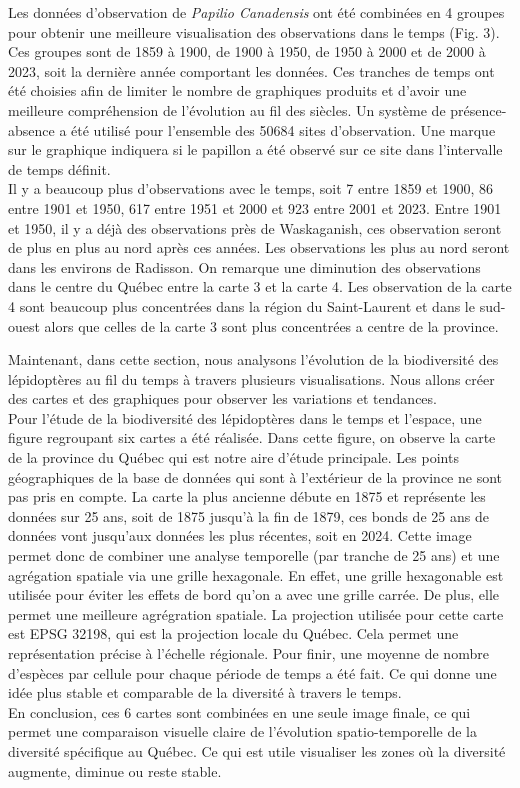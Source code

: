 \documentclass[9pt,twocolumn,twoside,]{pnas-new}
\begin{document}
Les données d'observation de \emph{Papilio Canadensis} ont été combinées
en 4 groupes pour obtenir une meilleure visualisation des observations
dans le temps (Fig. 3). Ces groupes sont de 1859 à 1900, de 1900 à 1950,
de 1950 à 2000 et de 2000 à 2023, soit la dernière année comportant les
données. Ces tranches de temps ont été choisies afin de limiter le
nombre de graphiques produits et d'avoir une meilleure compréhension de
l'évolution au fil des siècles. Un système de présence-absence a été
utilisé pour l'ensemble des 50684 sites d'observation. Une marque sur le
graphique indiquera si le papillon a été observé sur ce site dans
l'intervalle de temps définit.\\
Il y a beaucoup plus d'observations avec le temps, soit 7 entre 1859 et
1900, 86 entre 1901 et 1950, 617 entre 1951 et 2000 et 923 entre 2001 et
2023. Entre 1901 et 1950, il y a déjà des observations près de
Waskaganish, ces observation seront de plus en plus au nord après ces
années. Les observations les plus au nord seront dans les environs de
Radisson. On remarque une diminution des observations dans le centre du
Québec entre la carte 3 et la carte 4. Les observation de la carte 4
sont beaucoup plus concentrées dans la région du Saint-Laurent et dans
le sud-ouest alors que celles de la carte 3 sont plus concentrées a
centre de la province.

Maintenant, dans cette section, nous analysons l'évolution de la
biodiversité des lépidoptères au fil du temps à travers plusieurs
visualisations. Nous allons créer des cartes et des graphiques pour
observer les variations et tendances.\\
Pour l'étude de la biodiversité des lépidoptères dans le temps et
l'espace, une figure regroupant six cartes a été réalisée. Dans cette
figure, on observe la carte de la province du Québec qui est notre aire
d'étude principale. Les points géographiques de la base de données qui
sont à l'extérieur de la province ne sont pas pris en compte. La carte
la plus ancienne débute en 1875 et représente les données sur 25 ans,
soit de 1875 jusqu'à la fin de 1879, ces bonds de 25 ans de données vont
jusqu'aux données les plus récentes, soit en 2024. Cette image permet
donc de combiner une analyse temporelle (par tranche de 25 ans) et une
agrégation spatiale via une grille hexagonale. En effet, une grille
hexagonable est utilisée pour éviter les effets de bord qu'on a avec une
grille carrée. De plus, elle permet une meilleure agrégration spatiale.
La projection utilisée pour cette carte est EPSG 32198, qui est la
projection locale du Québec. Cela permet une représentation précise à
l'échelle régionale. Pour finir, une moyenne de nombre d'espèces par
cellule pour chaque période de temps a été fait. Ce qui donne une idée
plus stable et comparable de la diversité à travers le temps.\\
En conclusion, ces 6 cartes sont combinées en une seule image finale, ce
qui permet une comparaison visuelle claire de l'évolution
spatio-temporelle de la diversité spécifique au Québec. Ce qui est utile
visualiser les zones où la diversité augmente, diminue ou reste stable.
\end{document}

